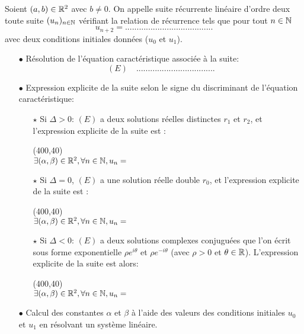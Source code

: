 \documentclass[a4paper, 11pt]{article}
\begin{document}


\begin{defi} 
Soient $(a,b)\in\mathbb{R}^2$ avec $b\not=0$. On appelle suite r\'ecurrente lin\'eaire d'ordre deux toute suite $(u_n)_{n\in \mathbb{N}}$ v\'erifiant la relation de r\'ecurrence tels que pour tout $n\in\mathbb{N}$
$$ u_{n+2}=......................................$$
avec deux conditions initiales donn\'ees ($u_0$ et $u_1$).
\end{defi}


\setlength\fboxrule{1pt}

\begin{itemize}
\item[$\bullet$] R\'esolution de l'\'equation caract\'eristique associ\'ee \`{a} la suite:
$$(E)\quad..................................$$
\item[$\bullet$] Expression explicite de la suite selon le signe du discriminant de l'\'equation caract\'eristique:
\begin{itemize}
\item[$\star$] Si $\Delta>0$: $(E)$ a deux solutions r\'eelles distinctes $r_1$ et $r_2$, et l'expression explicite de la suite est :

\framebox(400,40){$ \exists (\alpha,\beta)\in\bR^2,\forall n\in\N, u_n=\hspace{9cm}$ }

\vspace{0.1cm}

\item[$\star$] Si $\Delta=0$, $(E)$ a une solution r\'eelle double $r_0$, et l'expression explicite de la suite est :

\framebox(400,40){$ \exists (\alpha,\beta)\in\bR^2,\forall n\in\N, u_n=\hspace{9cm}$ }
\vspace{0.1cm}
\item[$\star$] Si $\Delta<0$:  $(E)$ a deux solutions complexes conjugu\'ees que l'on \'ecrit sous forme exponentielle $\rho e^{i\theta}$ et $\rho e^{-i\theta}$ (avec $\rho>0$ et $\theta\in\mathbb{R}$). L'expression explicite de la suite est alors:

\framebox(400,40){$ \exists (\alpha,\beta)\in\bR^2,\forall n\in\N, u_n=\hspace{9cm}$ }
\vspace{0.1cm}
\end{itemize}
\item[$\bullet$] Calcul des constantes $\alpha$ et $\beta$ \`{a} l'aide des valeurs des conditions initiales $u_0$ et $u_1$ en r\'esolvant un syst\`eme lin\'eaire. 
\end{itemize}
\end{document}
